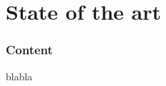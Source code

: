\part{State of the art}
\nopagebreak
\section*{Content}
blabla
\afterpage{\blankpage}
\newpage

\newpage
%

\afterpage{\blankpage}
\newpage
